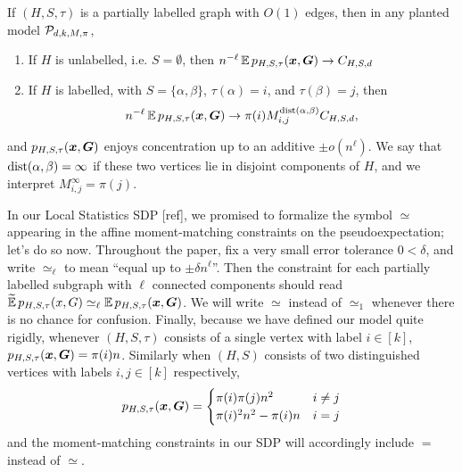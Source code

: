 \begin{theorem}
    If $(H,S,\tau)$ is a partially labelled graph with $O(1)$ edges, then in any planted model $\mathcal{P}_{d,k,M,\pi}$,
    \begin{enumerate}
        \item If $H$ is unlabelled, i.e. $S = \emptyset$, then $n^{-\ell} \operatorname*{\mathbb{E}} p_{H,S,\tau}({\boldsymbol{x}},\boldsymbol{G}) \to C_{H,S,d}$
        \item If $H$ is labelled, with $S = \{\alpha,\beta\}$, $\tau(\alpha) = i$, and $\tau(\beta) = j$, then
        $$
            n^{-\ell} \operatorname*{\mathbb{E}} p_{H,S,\tau}({\boldsymbol{x}},\boldsymbol{G}) \to \pi(i) M_{i,j}^{\operatorname{dist}(\alpha,\beta)} C_{H,S,d},
        $$
    \end{enumerate}
    and $p_{H,S,\tau}({\boldsymbol{x}},\boldsymbol{G})$ enjoys concentration up to an additive $\pm o(n^\ell)$. We say that $\operatorname{dist}(\alpha,\beta) = \infty$ if these two vertices lie in disjoint components of $H$, and we interpret $M_{i,j}^\infty = \pi(j)$.
\end{theorem}

\begin{remark}
    In our Local Statistics SDP [ref], we promised to formalize the symbol $\simeq$ appearing in the affine moment-matching constraints on the pseudoexpectation; let's do so now. Throughout the paper, fix a very small error tolerance $0 < \delta$, and write $\simeq_\ell$ to mean ``equal up to $\pm \delta n^\ell$''. Then the constraint for each partially labelled subgraph with $\ell$ connected components should read $\widetilde{\operatorname*{\mathbb{E}}}\, p_{H,S,\tau}(x,G) \simeq_\ell \operatorname*{\mathbb{E}} p_{H,S,\tau}({\boldsymbol{x}},\boldsymbol{G})$. We will write $\simeq$ instead of $\simeq_1$ whenever there is no chance for confusion. Finally, because we have defined our model quite rigidly, whenever $(H,S,\tau)$ consists of a single vertex with label $i\in [k]$, $p_{H,S,\tau}({\boldsymbol{x}},\boldsymbol{G}) = \pi(i)n$. Similarly when $(H,S)$ consists of two distinguished vertices with labels $i,j\in[k]$ respectively, $$
        p_{H,S,\tau}({\boldsymbol{x}},\boldsymbol{G}) = \begin{cases} \pi(i)\pi(j)n^2 &i\neq j \\
        \pi(i)^2n^2 - \pi(i)n &i=j \end{cases}
    $$
    and the moment-matching constraints in our SDP will accordingly include $=$ instead of $\simeq$.
\end{remark}

